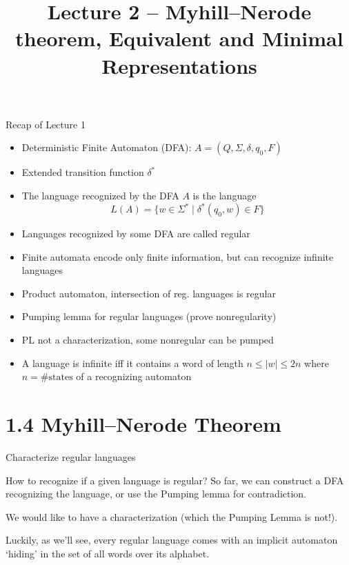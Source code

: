 \documentclass[handout]{beamer}
\title{Lecture 2 -- Myhill--Nerode theorem, Equivalent and Minimal Representations}
\begin{document}
\frame{\titlepage}


\begin{frame}{Recap of Lecture 1}

    \begin{itemize}
        \item  \alert{Deterministic Finite Automaton (DFA)}: $A=(Q,\Sigma,\delta,q_0,F)$
        \item Extended transition function $\delta^*$
        \item The language \alert{recognized} by the DFA $A$ is the language 
        $$
        L(A)=\{w\in \Sigma^* \mid \delta^*(q_0,w)\in F\}
        $$    
        \item Languages recognized by some DFA are called \alert{regular}
        \item Finite automata encode only finite information, but can recognize infinite languages
        \item Product automaton, intersection of reg. languages is regular      
        \item \alert{Pumping lemma for regular languages} (prove nonregularity)
        \item PL not a characterization, some nonregular can be pumped
        \item A language is infinite iff it contains a word of length $n\leq |w|\leq 2n$ where $n=\#\text{states}$ of a recognizing automaton
    \end{itemize}

\end{frame}


\section{1.4 Myhill--Nerode Theorem}


\begin{frame}{Characterize regular languages}

    How to recognize if a given language is regular? So far, we can construct a DFA recognizing the language, or use the Pumping lemma for contradiction. 
    
    We would like to have a \alert{characterization} (which the Pumping Lemma is not!).

    Luckily, as we'll see, every regular language comes with an implicit automaton `hiding' in the set of all words over its alphabet.

\end{frame}
\end{document}
